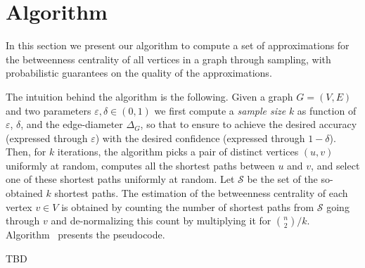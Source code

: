 \section{Algorithm}\label{sec:algo}
In this section we present our algorithm to compute a set of approximations for the
betweenness centrality of all vertices in a graph through sampling, with
probabilistic guarantees on the quality of the approximations.

The intuition behind the algorithm is the following. Given a graph $G=(V,E)$ and
two parameters $\varepsilon,\delta\in(0,1)$ we first compute a \emph{sample
size} $k$ as function of $\varepsilon$, $\delta$, and the edge-diameter
$\Delta_G$, so that to ensure to achieve the desired accuracy (expressed through
$\varepsilon$) with the desired confidence (expressed through $1-\delta$). Then,
for $k$ iterations, the algorithm picks a pair of distinct vertices $(u,v)$
uniformly at random, computes all the shortest paths between $u$ and $v$,
and select one of these shortest paths uniformly at random. Let $\mathcal{S}$ be
the set of the so-obtained $k$ shortest paths. The estimation of the betweenness
centrality of each vertex $v\in V$ is obtained by counting the number of
shortest paths from $\mathcal{S}$ going through $v$ and de-normalizing this
count by multiplying it for $\binom{n}{2}/k$. Algorithm~\XXX %
presents the pseudocode.

\XXX TBD
